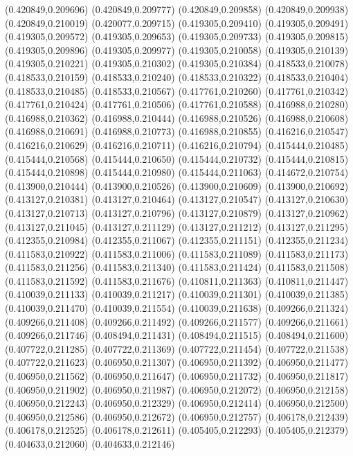 (0.420849,0.209696)
(0.420849,0.209777)
(0.420849,0.209858)
(0.420849,0.209938)
(0.420849,0.210019)
(0.420077,0.209715)
(0.419305,0.209410)
(0.419305,0.209491)
(0.419305,0.209572)
(0.419305,0.209653)
(0.419305,0.209733)
(0.419305,0.209815)
(0.419305,0.209896)
(0.419305,0.209977)
(0.419305,0.210058)
(0.419305,0.210139)
(0.419305,0.210221)
(0.419305,0.210302)
(0.419305,0.210384)
(0.418533,0.210078)
(0.418533,0.210159)
(0.418533,0.210240)
(0.418533,0.210322)
(0.418533,0.210404)
(0.418533,0.210485)
(0.418533,0.210567)
(0.417761,0.210260)
(0.417761,0.210342)
(0.417761,0.210424)
(0.417761,0.210506)
(0.417761,0.210588)
(0.416988,0.210280)
(0.416988,0.210362)
(0.416988,0.210444)
(0.416988,0.210526)
(0.416988,0.210608)
(0.416988,0.210691)
(0.416988,0.210773)
(0.416988,0.210855)
(0.416216,0.210547)
(0.416216,0.210629)
(0.416216,0.210711)
(0.416216,0.210794)
(0.415444,0.210485)
(0.415444,0.210568)
(0.415444,0.210650)
(0.415444,0.210732)
(0.415444,0.210815)
(0.415444,0.210898)
(0.415444,0.210980)
(0.415444,0.211063)
(0.414672,0.210754)
(0.413900,0.210444)
(0.413900,0.210526)
(0.413900,0.210609)
(0.413900,0.210692)
(0.413127,0.210381)
(0.413127,0.210464)
(0.413127,0.210547)
(0.413127,0.210630)
(0.413127,0.210713)
(0.413127,0.210796)
(0.413127,0.210879)
(0.413127,0.210962)
(0.413127,0.211045)
(0.413127,0.211129)
(0.413127,0.211212)
(0.413127,0.211295)
(0.412355,0.210984)
(0.412355,0.211067)
(0.412355,0.211151)
(0.412355,0.211234)
(0.411583,0.210922)
(0.411583,0.211006)
(0.411583,0.211089)
(0.411583,0.211173)
(0.411583,0.211256)
(0.411583,0.211340)
(0.411583,0.211424)
(0.411583,0.211508)
(0.411583,0.211592)
(0.411583,0.211676)
(0.410811,0.211363)
(0.410811,0.211447)
(0.410039,0.211133)
(0.410039,0.211217)
(0.410039,0.211301)
(0.410039,0.211385)
(0.410039,0.211470)
(0.410039,0.211554)
(0.410039,0.211638)
(0.409266,0.211324)
(0.409266,0.211408)
(0.409266,0.211492)
(0.409266,0.211577)
(0.409266,0.211661)
(0.409266,0.211746)
(0.408494,0.211431)
(0.408494,0.211515)
(0.408494,0.211600)
(0.407722,0.211285)
(0.407722,0.211369)
(0.407722,0.211454)
(0.407722,0.211538)
(0.407722,0.211623)
(0.406950,0.211307)
(0.406950,0.211392)
(0.406950,0.211477)
(0.406950,0.211562)
(0.406950,0.211647)
(0.406950,0.211732)
(0.406950,0.211817)
(0.406950,0.211902)
(0.406950,0.211987)
(0.406950,0.212072)
(0.406950,0.212158)
(0.406950,0.212243)
(0.406950,0.212329)
(0.406950,0.212414)
(0.406950,0.212500)
(0.406950,0.212586)
(0.406950,0.212672)
(0.406950,0.212757)
(0.406178,0.212439)
(0.406178,0.212525)
(0.406178,0.212611)
(0.405405,0.212293)
(0.405405,0.212379)
(0.404633,0.212060)
(0.404633,0.212146)
